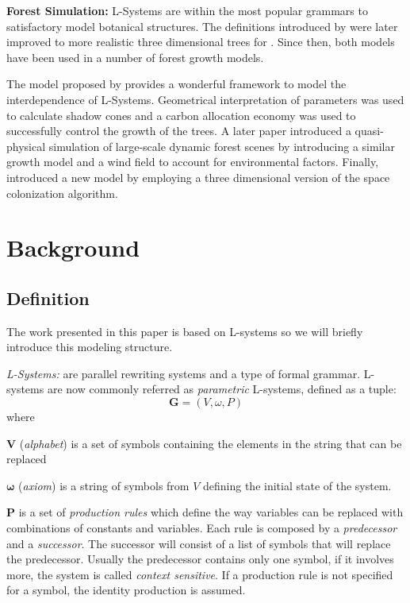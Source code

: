 \documentclass[letterpaper,twoside,11pt]{article}
\begin{document}
\begin{multicols}{2}
\textbf{Forest Simulation:} L-Systems are within the most popular grammars to satisfactory model botanical structures. The definitions introduced by \cite{Prusinkiewicz:1996:ABP:235579} were later improved to more realistic three dimensional trees for \cite{4055766}. Since then, both models have been used in a number of forest growth models.

The model proposed by \cite{KurthSloboda2002} provides a wonderful framework to model the interdependence of L-Systems. Geometrical interpretation of parameters was used to calculate shadow cones and a carbon allocation economy was used to successfully control the growth of the trees. A later paper introduced a quasi-physical simulation of large-scale dynamic forest scenes by introducing a similar growth model and a wind field to account for environmental factors. Finally, \cite{Runions07modelingtrees} introduced a new model by employing a three dimensional version of the space colonization algorithm.


\section{Background} %
\label{sec:background}

\subsection{Definition} %
\label{sub:definition}

The work presented in this paper is based on L-systems so we will briefly introduce this modeling structure.

\emph{L-Systems:} are parallel rewriting systems and a type of formal grammar. L-systems are now commonly referred as \emph{parametric} L-systems, defined as a tuple:
\begin{equation}
	\textbf{G} = (V, \omega, P)
\end{equation}
where
\begin{compactitem}
\item $\textbf{V}$ (\emph{alphabet}) is a set of symbols containing the elements in the string that can be replaced
\item $\boldsymbol\omega$ (\emph{axiom}) is a string of symbols from $V$ defining the initial state of the system.
\item $\textbf{P}$ is a set of \emph{production rules} which define the way variables can be replaced with combinations of constants and variables. Each rule is composed by a \emph{predecessor} and a \emph{successor}. The successor will consist of a list of symbols that will replace the predecessor. Usually the predecessor contains only one symbol, if it involves more, the system is called \emph{context sensitive}. If a production rule is not specified for a symbol, the identity production is assumed.
\end{compactitem}


\end{multicols}
\end{document}
